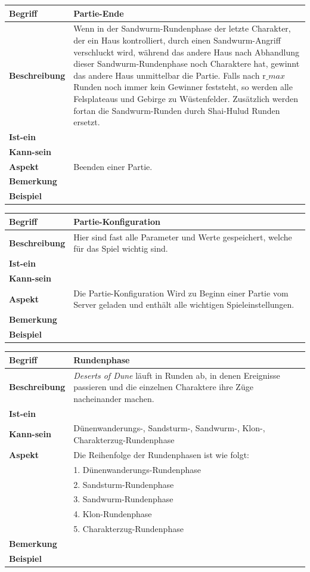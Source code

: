 \documentclass[12pt]{article}
\newcounter{fa}
\begin{document}
\begin{tabularx}{16cm}{|l|X|}
\hline
\textbf{Begriff} & \textbf{Partie-Ende} \\
\hline
\textbf{Beschreibung} & Wenn in der Sandwurm-Rundenphase der letzte Charakter, der ein Haus kontrolliert, durch einen Sandwurm-Angriff verschluckt wird, während das andere Haus nach Abhandlung dieser Sandwurm-Rundenphase noch Charaktere hat, gewinnt das andere Haus unmittelbar die Partie. Falls nach r$\_max$ Runden noch immer kein Gewinner feststeht, so werden alle Felsplateaus und Gebirge zu Wüstenfelder. Zusätzlich werden fortan die Sandwurm-Runden durch Shai-Hulud Runden ersetzt.\\
\hline
\textbf{Ist-ein} & \\
\hline
\textbf{Kann-sein} & \\
\hline
\textbf{Aspekt} & Beenden einer Partie.\\
\hline
\textbf{Bemerkung} &  \\
\hline
\textbf{Beispiel} &  \\
\hline
\end{tabularx}

\begin{tabularx}{16cm}{|l|X|}
\hline
\textbf{Begriff} & \textbf{Partie-Konfiguration} \\
\hline
\textbf{Beschreibung} & Hier sind fast alle Parameter und Werte gespeichert, welche für das Spiel wichtig sind. \\
\hline
\textbf{Ist-ein} & \\
\hline
\textbf{Kann-sein} & \\
\hline
\textbf{Aspekt} & Die Partie-Konfiguration Wird zu Beginn einer Partie vom Server geladen und enthält alle wichtigen Spieleinstellungen.\\
\hline
\textbf{Bemerkung} &  \\
\hline
\textbf{Beispiel} &  \\
\hline
\end{tabularx}

\begin{tabularx}{16cm}{|l|X|}
\hline
\textbf{Begriff} & \textbf{Rundenphase} \\
\hline
\textbf{Beschreibung} & \textit{Deserts of Dune} läuft in Runden ab, in denen Ereignisse passieren und die einzelnen Charaktere ihre Züge nacheinander machen. \\
\hline
\textbf{Ist-ein} & \\
\hline
\textbf{Kann-sein} & Dünenwanderungs-, Sandsturm-, Sandwurm-, Klon-, Charakterzug-Rundenphase\\
\hline
\textbf{Aspekt} & Die Reihenfolge der Rundenphasen ist wie folgt:\\
& 1. Dünenwanderungs-Rundenphase\\
& 2. Sandsturm-Rundenphase\\
& 3. Sandwurm-Rundenphase\\
& 4. Klon-Rundenphase\\
& 5. Charakterzug-Rundenphase\\
\hline
\textbf{Bemerkung} &  \\
\hline
\textbf{Beispiel} &  \\
\hline
\end{tabularx}
\end{document}
